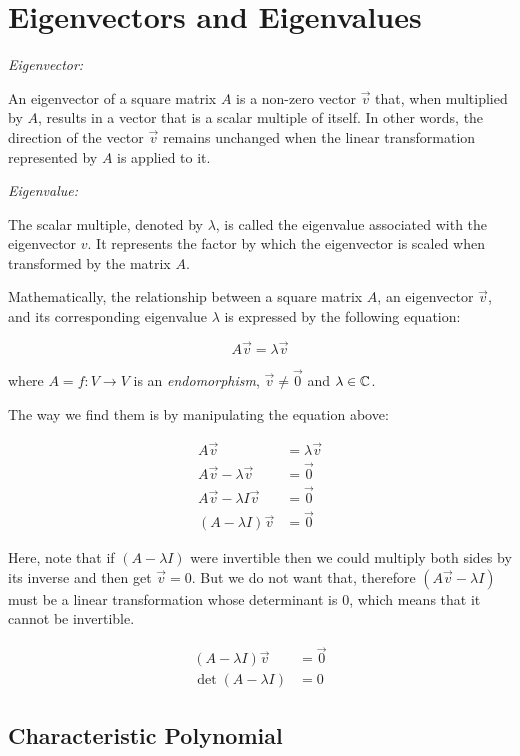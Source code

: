 \chapter{Eigenvectors and Eigenvalues}

\emph{Eigenvector:}

An eigenvector of a square matrix \(A\) is a non-zero vector \(\vec{v}\) that, when multiplied by 
\(A\), results in a vector that is a scalar multiple of itself. In other words, the direction of the 
vector \(\vec{v}\) remains unchanged when the linear transformation represented by 
\(A\) is applied to it.

\emph{Eigenvalue:}

The scalar multiple, denoted by \(\lambda\), is called the eigenvalue associated with the eigenvector 
\(v\). It represents the factor by which the eigenvector is scaled when transformed by 
the matrix \(A\).

Mathematically, the relationship between a square matrix \(A\), an eigenvector \(\vec{v}\), 
and its corresponding eigenvalue \(\lambda\) is expressed by the following equation:

\[
    A\vec{v} = \lambda\vec{v}
\]

where \(A = f: V \to V\) is an \emph{endomorphism}, \(\vec{v} \ne \vec{0}\) and  \(\lambda \in \mathbb{C}\).

The way we find them is by manipulating the equation above:

\begin{align*}    
    A\vec{v} &= \lambda\vec{v}\\
    A\vec{v} - \lambda\vec{v} &= \vec{0}\\
    A\vec{v} - \lambda I \vec{v} &= \vec{0}\\
    (A - \lambda I) \vec{v} &= \vec{0}
\end{align*}

Here, note that if \((A - \lambda I)\) were invertible then we could multiply both sides by 
its inverse and then get \(\vec{v} = 0\). But we do not want that, therefore \((A\vec{v} - \lambda I)\) 
must be a linear transformation whose determinant is \(0\), which means that it cannot be invertible.

\begin{align*}    
    (A - \lambda I) \vec{v} &= \vec{0}\\
    \det (A - \lambda I)  &= 0
\end{align*}

\section{Characteristic Polynomial}

